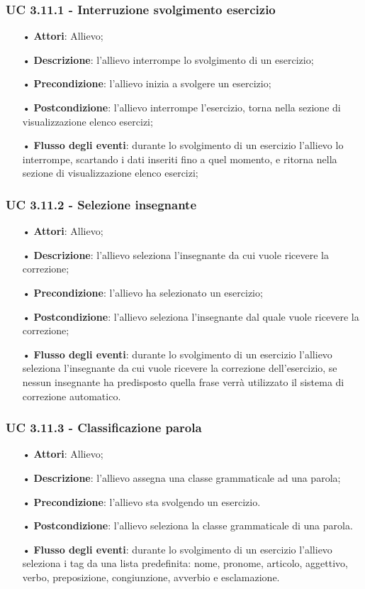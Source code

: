\subsubsection{UC 3.11.1 - Interruzione svolgimento esercizio}
\begin{itemize}
	\item[•]\textbf{Attori}: Allievo;
	\item[•]\textbf{Descrizione}: l'allievo interrompe lo svolgimento di un esercizio;
	\item[•]\textbf{Precondizione}: l'allievo inizia a svolgere un esercizio;
	\item[•]\textbf{Postcondizione}: l'allievo interrompe l'esercizio, torna nella sezione di visualizzazione elenco esercizi;
	\item[•]\textbf{Flusso degli eventi}: durante lo svolgimento di un esercizio l'allievo lo interrompe, scartando i dati inseriti fino a quel momento, e ritorna nella sezione di visualizzazione elenco esercizi;
\end{itemize}

\subsubsection{UC 3.11.2 - Selezione insegnante}
\begin{itemize}
	\item[•]\textbf{Attori}: Allievo;
	\item[•]\textbf{Descrizione}: l'allievo seleziona l'insegnante da cui vuole ricevere la correzione;
	\item[•]\textbf{Precondizione}: l'allievo ha selezionato un esercizio;
	\item[•]\textbf{Postcondizione}: l'allievo seleziona l'insegnante dal quale vuole ricevere la correzione;
	\item[•]\textbf{Flusso degli eventi}: durante lo svolgimento di un esercizio  l'allievo seleziona l'insegnante da cui vuole ricevere la correzione dell'esercizio, se nessun insegnante ha predisposto quella frase verrà utilizzato il sistema di correzione automatico.
\end{itemize}

\subsubsection{UC 3.11.3 - Classificazione parola}
\begin{itemize}
	\item[•]\textbf{Attori}: Allievo;
	\item[•]\textbf{Descrizione}: l'allievo assegna una classe grammaticale ad una parola;
		\item[•]\textbf{Precondizione}: l'allievo sta svolgendo un esercizio.
	\item[•]\textbf{Postcondizione}: l'allievo seleziona la classe grammaticale di una parola.
	\item[•]\textbf{Flusso degli eventi}: durante lo svolgimento di un esercizio  l'allievo seleziona i tag da una lista predefinita: nome, pronome, articolo, aggettivo, verbo, preposizione, congiunzione, avverbio e esclamazione.
\end{itemize}


